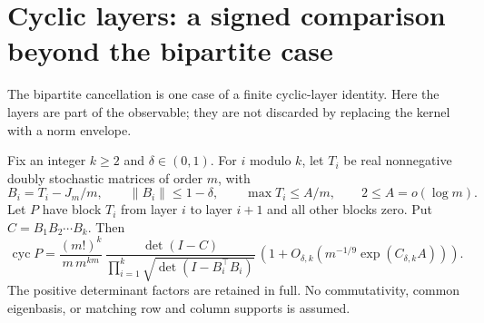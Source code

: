 \section{Cyclic layers: a signed comparison beyond the bipartite case}
\label{sec:periodiccomparison}
The bipartite cancellation is one case of a finite cyclic-layer
identity. Here the layers are part of the observable; they are
not discarded by replacing the kernel with a norm envelope.

\begin{theorem}
\label{thm:periodiccomparison}
Fix an integer \(k\geq2\) and \(\delta\in(0,1)\).
For \(i\) modulo \(k\), let \(T_i\) be real nonnegative doubly
stochastic matrices of order \(m\), with
\[
 B_i=T_i-J_m/m,\qquad \|B_i\|\leq1-\delta,\qquad
 \max T_i\leq A/m,\qquad 2\leq A=o(\log m).
\]
Let \(P\) have block \(T_i\) from layer \(i\) to layer \(i+1\)
and all other blocks zero. Put \(C=B_1B_2\cdots B_k\).
Then
\[
 \operatorname{cyc}P
 =\frac{(m!)^k}{m\,m^{km}}\,
   \frac{\det(I-C)}
        {\prod_{i=1}^k\sqrt{\det(I-B_i^\top B_i)}}\,
   \left(1+O_{\delta,k}
       \left(m^{-1/9}\exp(C_{\delta,k}A)\right)\right).
\]
The positive determinant factors are retained in full.
No commutativity, common eigenbasis, or matching row and
column supports is assumed.
\end{theorem}
